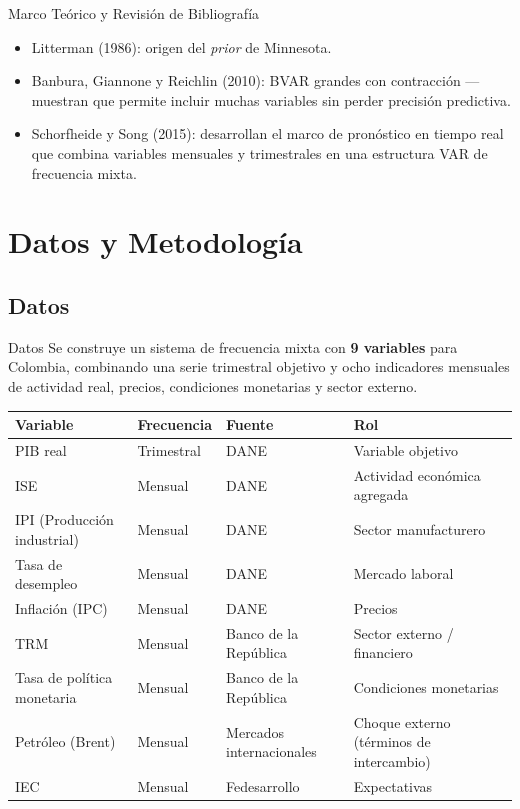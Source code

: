 \documentclass{beamer}
\begin{document}
\begin{frame}{Marco Teórico y Revisión de Bibliografía}{}
\begin{itemize}\justifying
	\item \textcolor[rgb]{0,0,1}{Litterman (1986)}: origen del \textit{prior} de Minnesota.
	\item \textcolor[rgb]{0,0,1}{Banbura, Giannone y Reichlin (2010)}: BVAR grandes con contracción — muestran que permite incluir muchas variables sin perder precisión predictiva.
	\item \textcolor[rgb]{0.29,0,0.51}{Schorfheide y Song (2015)}: desarrollan el marco de pronóstico en tiempo real que combina variables mensuales y trimestrales en una estructura VAR de frecuencia mixta.
\end{itemize}
\end{frame}


\section{Datos y Metodología}

\subsection{Datos}

\begin{frame}{Datos}{}\justifying
Se construye un sistema de frecuencia mixta con \textbf{9 variables} para Colombia, combinando una serie trimestral objetivo y ocho indicadores mensuales de actividad real, precios, condiciones monetarias y sector externo. \pause

\begin{table}[h]
\centering
\tiny
\begin{tabular}{llll}
\toprule
\textbf{Variable} & \textbf{Frecuencia} & \textbf{Fuente} & \textbf{Rol} \\
\midrule
PIB real & Trimestral & DANE & Variable objetivo \\
ISE & Mensual & DANE & Actividad económica agregada \\
IPI (Producción industrial) & Mensual & DANE & Sector manufacturero \\
Tasa de desempleo & Mensual & DANE & Mercado laboral \\
Inflación (IPC) & Mensual & DANE & Precios \\
TRM & Mensual & Banco de la República & Sector externo / financiero \\
Tasa de política monetaria & Mensual & Banco de la República & Condiciones monetarias \\
Petróleo (Brent) & Mensual & Mercados internacionales & Choque externo (términos de intercambio) \\
IEC & Mensual & Fedesarrollo & Expectativas \\
\bottomrule
\end{tabular}
\end{table}
\end{frame}
\end{document}

